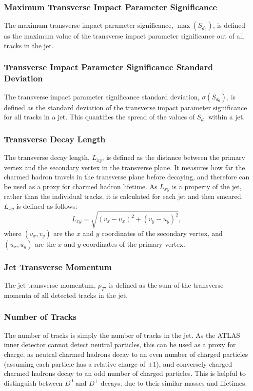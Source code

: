 \documentclass[12pt]{article}
\begin{document}
\subsubsection*{Maximum Transverse Impact Parameter Significance}
The maximum transverse impact parameter significance, $\max(S_{d_0})$, is defined as the maximum value of the transverse impact parameter significance out of all tracks in the jet.

\subsubsection*{Transverse Impact Parameter Significance Standard Deviation}
The transverse impact parameter significance standard deviation, $\sigma(S_{d_0})$, is defined as the standard deviation of the transverse impact parameter significance for all tracks in a jet. This quantifies the spread of the values of $S_{d_0}$ within a jet.

\subsubsection*{Transverse Decay Length}
The transverse decay length, $L_{xy}$, is defined as the distance between the primary vertex and the secondary vertex in the transverse plane. It measures how far the charmed hadron travels in the transverse plane before decaying, and therefore can be used as a proxy for charmed hadron lifetime. As $L_{xy}$ is a property of the jet, rather than the individual tracks, it is calculated for each jet and then smeared. $L_{xy}$ is defined as follows:
\begin{equation}
    L_{xy} = \sqrt{(v_x - u_x)^2 + (v_y - u_y)^2},
\end{equation}
where $(v_x, v_y)$ are the $x$ and $y$ coordinates of the secondary vertex, and $(u_x, u_y)$ are the $x$ and $y$ coordinates of the primary vertex.

\subsubsection*{Jet Transverse Momentum}
The jet transverse momentum, $p_T$, is defined as the sum of the transverse momenta of all detected tracks in the jet.

\subsubsection*{Number of Tracks}
The number of tracks is simply the number of tracks in the jet. As the ATLAS inner detector cannot detect neutral particles, this can be used as a proxy for charge, as neutral charmed hadrons decay to an even number of charged particles (assuming each particle has a relative charge of $\pm 1$), and conversely charged charmed hadrons decay to an odd number of charged particles. This is helpful to distinguish between $D^0$ and $D^+$ decays, due to their similar masses and lifetimes.
\end{document}

